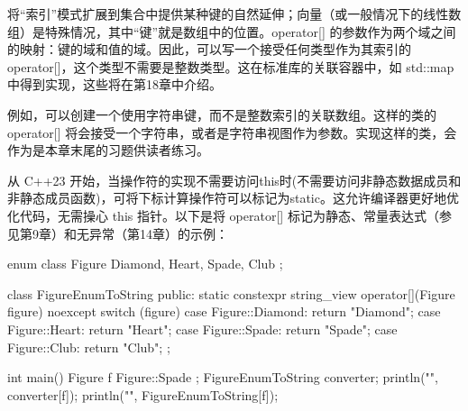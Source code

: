 
将“索引”模式扩展到集合中提供某种键的自然延伸；向量（或一般情况下的线性数组）是特殊情况，其中“键”就是数组中的位置。operator[] 的参数作为两个域之间的映射：键的域和值的域。因此，可以写一个接受任何类型作为其索引的operator[]，这个类型不需要是整数类型。这在标准库的关联容器中，如 std::map 中得到实现，这些将在第18章中介绍。

例如，可以创建一个使用字符串键，而不是整数索引的关联数组。这样的类的 operator[] 将会接受一个字符串，或者是字符串视图作为参数。实现这样的类，会作为是本章末尾的习题供读者练习。

\hspace*{\fill}



从 C++23 开始，当操作符的实现不需要访问this时(不需要访问非静态数据成员和非静态成员函数)，可将下标计算操作符可以标记为static。这允许编译器更好地优化代码，无需操心 this 指针。以下是将 operator[] 标记为静态、常量表达式（参见第9章）和无异常（第14章）的示例：

\begin{cpp}
enum class Figure { Diamond, Heart, Spade, Club };

class FigureEnumToString
{
    public:
        static constexpr string_view operator[](Figure figure) noexcept
        {
            switch (figure) {
                case Figure::Diamond: return "Diamond";
                case Figure::Heart: return "Heart";
                case Figure::Spade: return "Spade";
                case Figure::Club: return "Club";
            }
        }
};

int main()
{
    Figure f { Figure::Spade };
    FigureEnumToString converter;
    println("{}", converter[f]);
    println("{}", FigureEnumToString{}[f]);
}
\end{cpp}












